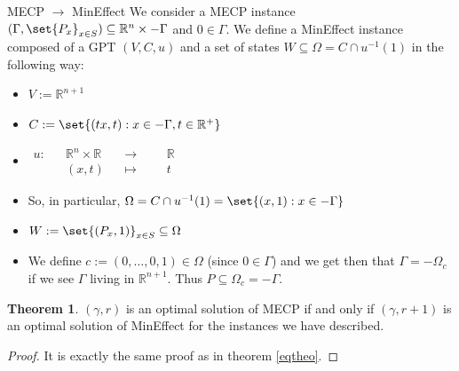 \documentclass{article}
\theoremstyle{definition}
\newtheorem{theo}{Theorem}[section]
\theoremstyle{remark}
\begin{document}
\begin{subsubsection}{MECP $\rightarrow$ MinEffect}
  We consider a MECP instance $(\Gamma,\set{P_x}_{x \in S}) \subseteq \mathbb{R}^n \times -\Gamma$ and $0 \in \Gamma$. We define a MinEffect instance composed of a GPT $(V,C,u)$ and a set of states $W \subseteq \Omega = C \cap u^{-1}(1)$ in the following way:
  \begin{itemize}
  \item $V := \mathbb{R}^{n+1}$
  \item $C := \set{(tx,t) : x \in -\Gamma, t \in \mathbb{R}^+}$
  \item $\begin{aligned}
      u : && \mathbb{R}^n \times \mathbb{R} &&\rightarrow&&& \mathbb{R}\\
      && (x,t) &&\mapsto&&& t
    \end{aligned}$

  \item So, in particular, $\Omega = C \cap  u^{-1}(1) = \set{(x,1) : x \in -\Gamma}$
  \item $W := \set{(P_x,1)}_{x \in S} \subseteq \Omega$
  \item We define $c:=(0,\ldots,0,1) \in \Omega$ (since $0 \in \Gamma$) and we get then that $\Gamma = -\Omega_c$ if we see $\Gamma$ living in $\mathbb{R}^{n+1}$. Thus $P \subseteq \Omega_c = -\Gamma$.
  \end{itemize}

  \begin{theo}
    $(\gamma,r)$ is an optimal solution of MECP if and only if $(\gamma,r+1)$ is an optimal solution of MinEffect for the instances we have described.
  \end{theo}
  
  \begin{proof}
    It is exactly the same proof as in theorem \ref{eqtheo}.
  \end{proof}
\end{subsubsection}
\end{document}
